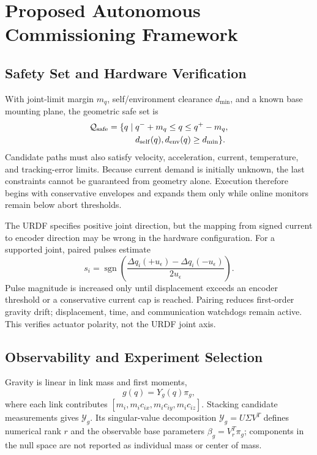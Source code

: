 \documentclass[conference]{IEEEtran}
\begin{document}
\section{Proposed Autonomous Commissioning Framework}
\subsection{Safety Set and Hardware Verification}
With joint-limit margin $m_q$, self/environment clearance $d_{\min}$, and a
known base mounting plane, the geometric safe set is
\begin{equation}
 \begin{aligned}
 \mathcal Q_{\rm safe}=\{q\mid{}&q^-+m_q\le q\le q^+-m_q,\\
                         &d_{\rm self}(q),d_{\rm env}(q)\ge d_{\min}\}.
 \end{aligned}
 \label{eq:safe_set}
\end{equation}
Candidate paths must also satisfy velocity, acceleration, current, temperature,
and tracking-error limits. Because current demand is initially unknown, the
last constraints cannot be guaranteed from geometry alone. Execution therefore
begins with conservative envelopes and expands them only while online monitors
remain below abort thresholds.

The URDF specifies positive joint direction, but the mapping from signed
current to encoder direction may be wrong in the hardware configuration. For a
supported joint, paired pulses estimate
\begin{equation}
 s_i=\operatorname{sgn}\!\left(
 \frac{\Delta q_i(+u_\epsilon)-\Delta q_i(-u_\epsilon)}{2u_\epsilon}\right).
 \label{eq:polarity}
\end{equation}
Pulse magnitude is increased only until displacement exceeds an encoder
threshold or a conservative current cap is reached. Pairing reduces first-order
gravity drift; displacement, time, and communication watchdogs remain active.
This verifies actuator polarity, not the URDF joint axis.

\subsection{Observability and Experiment Selection}
Gravity is linear in link mass and first moments,
\begin{equation}
 g(q)=Y_g(q)\pi_g,
 \label{eq:gravity_regressor}
\end{equation}
where each link contributes $[m_i,m_ic_{ix},m_ic_{iy},m_ic_{iz}]$. Stacking
candidate measurements gives $\mathcal Y_g$. Its singular-value decomposition
$\mathcal Y_g=U\Sigma V^T$ defines numerical rank $r$ and the observable base
parameters $\beta_g=V_r^T\pi_g$; components in the null space are not reported
as individual mass or center of mass.
\end{document}
